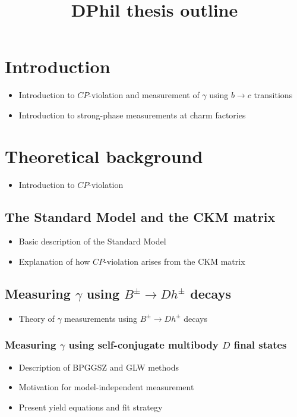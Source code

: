 \documentclass[12pt, a4paper, notitlepage, onecolumn]{article}
\title{DPhil thesis outline}
\author{}
\date{}
\begin{document}
\maketitle
\vspace{-1.5cm}
\section{Introduction}
\begin{itemize}[nosep]
  \setlength{\itemindent}{0em}
  \item{Introduction to $C\!P$-violation and measurement of $\gamma$ using $b\to c$ transitions}
  \item{Introduction to strong-phase measurements at charm factories}
\end{itemize}

\section{Theoretical background}
  \begin{itemize}[nosep]
    \setlength{\itemindent}{0em}
    \item{Introduction to $C\!P$-violation}
  \end{itemize}
\subsection{The Standard Model and the CKM matrix}
  \begin{itemize}[nosep]
    \setlength{\itemindent}{2em}
    \item[\textendash]{Basic description of the Standard Model}
    \item[\textendash]{Explanation of how $C\!P$-violation arises from the CKM matrix}
  \end{itemize}
\subsection{Measuring \texorpdfstring{$\gamma$}{gamma} using \texorpdfstring{$B^\pm\to Dh^\pm$}{B2Dh} decays}
  \begin{itemize}[nosep]
    \setlength{\itemindent}{2em}
    \item[\textendash]{Theory of $\gamma$ measurements using $B^\pm\to Dh^\pm$ decays}
  \end{itemize}
\subsubsection{Measuring \texorpdfstring{$\gamma$}{gamma} using self-conjugate multibody \texorpdfstring{$D$}{D} final states}
  \begin{itemize}[nosep]
    \setlength{\itemindent}{2.5em}
    \item[\textasteriskcentered]{Description of BPGGSZ and GLW methods}
    \item[\textasteriskcentered]{Motivation for model-independent measurement}
    \item[\textasteriskcentered]{Present yield equations and fit strategy}
  \end{itemize}
\end{document}
